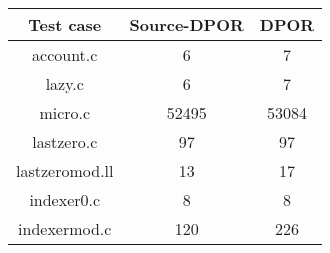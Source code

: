 \begin{center}
\begin{tabular}{ |c|c|c| }
\hline
Test case & Source-DPOR & DPOR \\
\hline \hline
account.c & 6 & 7\\
\hline
lazy.c & 6 & 7\\
\hline
micro.c & 52495 & 53084\\
\hline
lastzero.c & 97 & 97\\
\hline
lastzeromod.ll & 13 & 17\\
\hline
indexer0.c & 8 & 8\\
\hline
indexermod.c & 120 & 226\\
\hline
\end{tabular}
\end{center}
